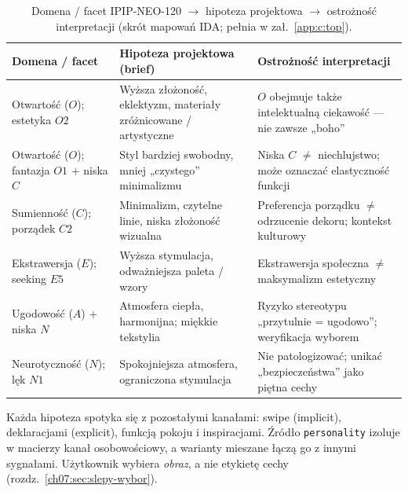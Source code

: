 \begin{table}[htbp]
  \centering
  \caption{Domena / facet IPIP-NEO-120 $\rightarrow$ hipoteza projektowa $\rightarrow$ ostrożność interpretacji
    (skrót mapowań IDA; pełnia w zał.~\ref{app:c:top}).}
  \label{tab:ch05:hipotezy}
  \begin{tabular}{@{}p{}p{}p{}@{}}
    \toprule
    Domena / facet & Hipoteza projektowa (brief) & Ostrożność interpretacji \\
    \midrule
    Otwartość ($O$); estetyka $O2$
      & Wyższa złożoność, eklektyzm, materiały zróżnicowane / artystyczne
      & $O$ obejmuje także intelektualną ciekawość --- nie zawsze „boho” \\
    \addlinespace
    Otwartość ($O$); fantazja $O1$ + niska $C$
      & Styl bardziej swobodny, mniej „czystego” minimalizmu
      & Niska $C$ $\neq$ niechlujstwo; może oznaczać elastyczność funkcji \\
    \addlinespace
    Sumienność ($C$); porządek $C2$
      & Minimalizm, czytelne linie, niska złożoność wizualna
      & Preferencja porządku $\neq$ odrzucenie dekoru; kontekst kulturowy \\
    \addlinespace
    Ekstrawersja ($E$); seeking $E5$
      & Wyższa stymulacja, odważniejsza paleta / wzory
      & Ekstrawersja społeczna $\neq$ maksymalizm estetyczny \\
    \addlinespace
    Ugodowość ($A$) + niska $N$
      & Atmosfera ciepła, harmonijna; miękkie tekstylia
      & Ryzyko stereotypu „przytulnie = ugodowo”; weryfikacja wyborem \\
    \addlinespace
    Neurotyczność ($N$); lęk $N1$
      & Spokojniejsza atmosfera, ograniczona stymulacja
      & Nie patologizować; unikać „bezpieczeństwa” jako piętna cechy \\
    \bottomrule
  \end{tabular}
\end{table}


Każda hipoteza spotyka się z pozostałymi kanałami: swipe (implicit), deklaracjami (explicit), funkcją pokoju i inspiracjami.
Źródło \texttt{personality} izoluje w macierzy kanał osobowościowy, a warianty mieszane łączą go z innymi sygnałami. Użytkownik wybiera \emph{obraz}, a nie etykietę cechy (rozdz.~\ref{ch07:sec:slepy-wybor}).

